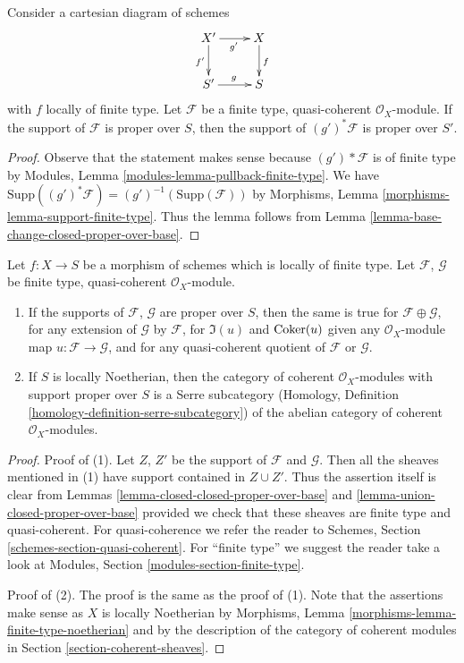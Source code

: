 \begin{lemma}
\label{lemma-base-change-module-support-proper-over-base}
Consider a cartesian diagram of schemes
$$
\xymatrix{
X' \ar[d]_{f'} \ar[r]_{g'} & X \ar[d]^f \\
S' \ar[r]^g & S
}
$$
with $f$ locally of finite type. Let $\mathcal{F}$ be a
finite type, quasi-coherent $\mathcal{O}_X$-module.
If the support of $\mathcal{F}$ is proper over $S$, then
the support of $(g')^*\mathcal{F}$ is proper over $S'$.
\end{lemma}

\begin{proof}
Observe that the statement makes sense because
$(g')*\mathcal{F}$ is of finite type by
Modules, Lemma \ref{modules-lemma-pullback-finite-type}.
We have $\text{Supp}((g')^*\mathcal{F}) = (g')^{-1}(\text{Supp}(\mathcal{F}))$
by Morphisms, Lemma \ref{morphisms-lemma-support-finite-type}.
Thus the lemma follows from
Lemma \ref{lemma-base-change-closed-proper-over-base}.
\end{proof}

\begin{lemma}
\label{lemma-cat-module-support-proper-over-base}
Let $f : X \to S$ be a morphism of schemes which is locally
of finite type. Let $\mathcal{F}$, $\mathcal{G}$
be finite type, quasi-coherent $\mathcal{O}_X$-module.
\begin{enumerate}
\item If the supports of $\mathcal{F}$, $\mathcal{G}$
are proper over $S$, then the same is true
for $\mathcal{F} \oplus \mathcal{G}$, for any extension
of $\mathcal{G}$ by $\mathcal{F}$, for $\Im(u)$ and $\mathop{\mathrm{Coker}}(u)$
given any $\mathcal{O}_X$-module map $u : \mathcal{F} \to \mathcal{G}$,
and for any quasi-coherent quotient of $\mathcal{F}$ or $\mathcal{G}$.
\item If $S$ is locally Noetherian, then the category of
coherent $\mathcal{O}_X$-modules with support proper over
$S$ is a Serre subcategory (Homology, Definition
\ref{homology-definition-serre-subcategory})
of the abelian category of
coherent $\mathcal{O}_X$-modules.
\end{enumerate}
\end{lemma}

\begin{proof}
Proof of (1). Let $Z$, $Z'$ be the support of $\mathcal{F}$
and $\mathcal{G}$. Then all the sheaves mentioned in (1)
have support contained in $Z \cup Z'$. Thus the assertion itself
is clear from Lemmas \ref{lemma-closed-closed-proper-over-base} and
\ref{lemma-union-closed-proper-over-base}
provided we check that these sheaves are finite type
and quasi-coherent. For quasi-coherence we refer the reader to
Schemes, Section \ref{schemes-section-quasi-coherent}.
For ``finite type'' we suggest the reader take a look at
Modules, Section \ref{modules-section-finite-type}.

\medskip\noindent
Proof of (2). The proof is the same as the proof of (1). Note that
the assertions make sense as $X$ is locally Noetherian by
Morphisms, Lemma \ref{morphisms-lemma-finite-type-noetherian}
and by the description of the category of coherent
modules in Section \ref{section-coherent-sheaves}.
\end{proof}


